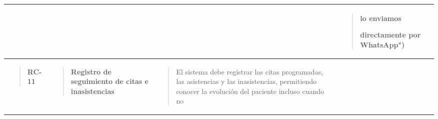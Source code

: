 \documentclass[
]{article}
\newcounter{none} %
\begin{document}
{\def\LTcaptype{none} %
\begin{longtable}[]{@{}
  >{\raggedright\arraybackslash}p{}
  >{\raggedright\arraybackslash}p{}
  >{\raggedright\arraybackslash}p{}
  >{\raggedright\arraybackslash}p{}
  >{\centering\arraybackslash}p{}@{}}
\toprule\noalign{}
\begin{minipage}[b]{\linewidth}\raggedright
\end{minipage} & \begin{minipage}[b]{\linewidth}\raggedright
\end{minipage} & \begin{minipage}[b]{\linewidth}\raggedright
\end{minipage} & \begin{minipage}[b]{\linewidth}\raggedright
\begin{quote}
lo enviamos

directamente por WhatsApp")
\end{quote}
\end{minipage} & \begin{minipage}[b]{\linewidth}\centering
\end{minipage} \\
\midrule\noalign{}
\endhead
\bottomrule\noalign{}
\endlastfoot
\begin{minipage}[t]{\linewidth}\raggedright
\begin{quote}
\textbf{RC-11}
\end{quote}
\end{minipage} & \begin{minipage}[t]{\linewidth}\raggedright
\begin{quote}
\textbf{Registro de seguimiento de citas e inasistencias}
\end{quote}
\end{minipage} & \begin{minipage}[t]{\linewidth}\raggedright
\begin{quote}
El sistema debe registrar las citas programadas, las asistencias y las
inasistencias, permitiendo conocer la evolución del paciente incluso
cuando no


\end{quote}
\end{minipage}
\end{longtable}}
\end{document}
